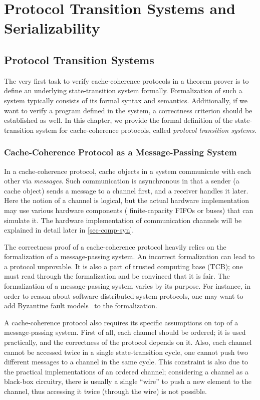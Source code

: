 \part{Protocol Transition Systems and Serializability}

\chapter{Protocol Transition Systems}
\label{sec-trs}

The very first task to verify cache-coherence protocols in a theorem prover is to define an underlying state-transition system formally.
Formalization of such a system typically consists of its formal syntax and semantics.
Additionally, if we want to verify a program defined in the system, a correctness criterion should be established as well.
In this chapter, we provide the formal definition of the state-transition system for cache-coherence protocols, called \emph{protocol transition systems}.

\section{Cache-Coherence Protocol as a Message-Passing System}
\label{sec-cc-as-mp}

In a cache-coherence protocol, cache objects in a system communicate with each other via \emph{messages}.
Such communication is asynchronous in that a sender (a cache object) sends a message to a channel first, and a receiver handles it later.
Here the notion of a channel is logical, but the actual hardware implementation may use various hardware components (\eg{} finite-capacity FIFOs or buses) that can simulate it.
The hardware implementation of communication channels will be explained in detail later in \autoref{sec-comp-syn}.

The correctness proof of a cache-coherence protocol heavily relies on the formalization of a message-passing system.
An incorrect formalization can lead to a protocol unprovable.
It is also a part of trusted computing base (TCB); one must read through the formalization and be convinced that it is fair.
The formalization of a message-passing system varies by its purpose.
For instance, in order to reason about software distributed-system protocols, one may want to add Byzantine fault models~\cite{byzantine} to the formalization.

A cache-coherence protocol also requires its specific assumptions on top of a message-passing system.
First of all, each channel should be ordered; it is used practically, and the correctness of the protocol depends on it.
Also, each channel cannot be accessed twice in a single state-transition cycle, \eg{} one cannot push two different messages to a channel in the same cycle.
This constraint is also due to the practical implementations of an ordered channel; considering a channel as a black-box circuitry, there is usually a single ``wire'' to push a new element to the channel, thus accessing it twice (through the wire) is not possible.

